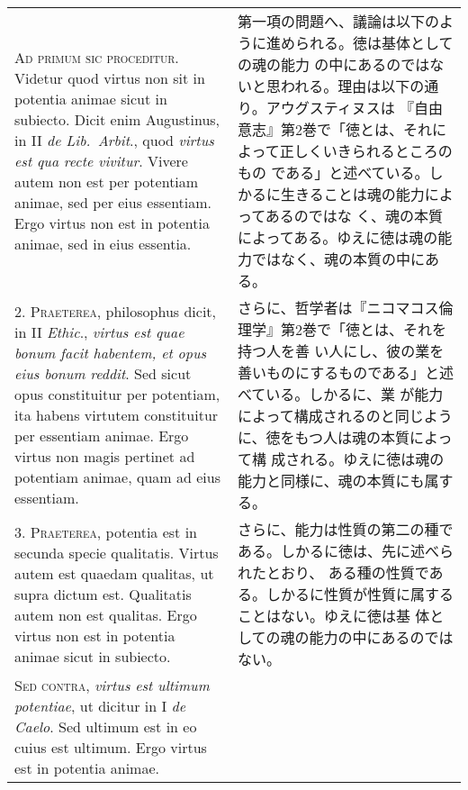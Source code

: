 \documentclass[10pt]{jsarticle}
\begin{document}
\begin{longtable}{p{21em}p{21em}}
{\scshape Ad primum sic proceditur}. Videtur quod virtus non sit in
potentia animae sicut in subiecto. Dicit enim Augustinus, in II
{\itshape de Lib.~Arbit}., quod {\itshape virtus est qua recte
vivitur}. Vivere autem non est per potentiam animae, sed per eius
essentiam. Ergo virtus non est in potentia animae, sed in eius
essentia.

&

第一項の問題へ、議論は以下のように進められる。徳は基体としての魂の能力
の中にあるのではないと思われる。理由は以下の通り。アウグスティヌスは
『自由意志』第2巻で「徳とは、それによって正しくいきられるところのもの
である」と述べている。しかるに生きることは魂の能力によってあるのではな
く、魂の本質によってある。ゆえに徳は魂の能力ではなく、魂の本質の中にあ
る。

\\

2. {\scshape Praeterea}, philosophus dicit, in II {\itshape Ethic}.,
{\itshape virtus est quae bonum facit habentem, et opus eius bonum
reddit}. Sed sicut opus constituitur per potentiam, ita habens
virtutem constituitur per essentiam animae. Ergo virtus non magis
pertinet ad potentiam animae, quam ad eius essentiam.

&

さらに、哲学者は『ニコマコス倫理学』第2巻で「徳とは、それを持つ人を善
い人にし、彼の業を善いものにするものである」と述べている。しかるに、業
が能力によって構成されるのと同じように、徳をもつ人は魂の本質によって構
成される。ゆえに徳は魂の能力と同様に、魂の本質にも属する。

\\

3. {\scshape Praeterea}, potentia est in secunda specie
qualitatis. Virtus autem est quaedam qualitas, ut supra dictum
est. Qualitatis autem non est qualitas. Ergo virtus non est in
potentia animae sicut in subiecto.

&

さらに、能力は性質の第二の種である。しかるに徳は、先に述べられたとおり、
ある種の性質である。しかるに性質が性質に属することはない。ゆえに徳は基
体としての魂の能力の中にあるのではない。

\\

{\scshape Sed contra}, {\itshape virtus est ultimum potentiae}, ut
dicitur in I {\itshape de Caelo}. Sed ultimum est in eo cuius est
ultimum. Ergo virtus est in potentia animae.


\end{longtable}
\end{document}
